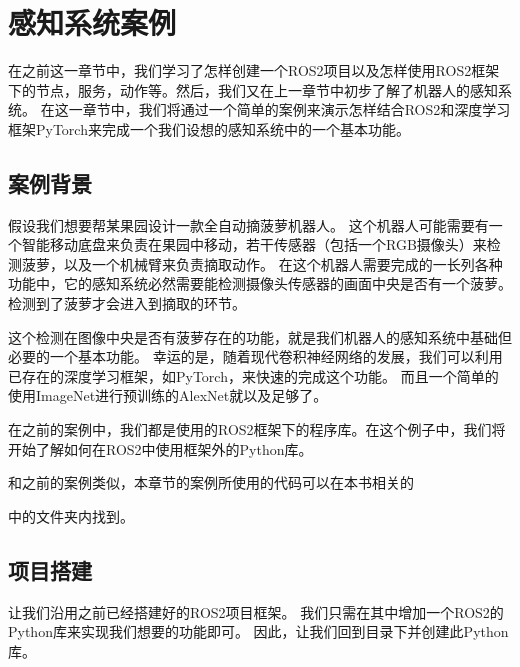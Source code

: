 \documentclass[letterpaper,10pt,english]{sphinxmanual}
\begin{document}
\section{感知系统案例}
\label{\detokenize{chapter_rl_sys/perception_code_ex:id1}}\label{\detokenize{chapter_rl_sys/perception_code_ex::doc}}
\sphinxAtStartPar
在之前这一章节中，我们学习了怎样创建一个ROS2项目以及怎样使用ROS2框架下的节点，服务，动作等。然后，我们又在上一章节中初步了解了机器人的感知系统。
在这一章节中，我们将通过一个简单的案例来演示怎样结合ROS2和深度学习框架PyTorch来完成一个我们设想的感知系统中的一个基本功能。


\subsection{案例背景}
\label{\detokenize{chapter_rl_sys/perception_code_ex:id2}}
\sphinxAtStartPar
假设我们想要帮某果园设计一款全自动摘菠萝机器人。
这个机器人可能需要有一个智能移动底盘来负责在果园中移动，若干传感器（包括一个RGB摄像头）来检测菠萝，以及一个机械臂来负责摘取动作。
在这个机器人需要完成的一长列各种功能中，它的感知系统必然需要能检测摄像头传感器的画面中央是否有一个菠萝。
检测到了菠萝才会进入到摘取的环节。

\sphinxAtStartPar
这个检测在图像中央是否有菠萝存在的功能，就是我们机器人的感知系统中基础但必要的一个基本功能。
幸运的是，随着现代卷积神经网络的发展，我们可以利用已存在的深度学习框架，如PyTorch，来快速的完成这个功能。
而且一个简单的使用ImageNet进行预训练的AlexNet就以及足够了。

\sphinxAtStartPar
在之前的案例中，我们都是使用的ROS2框架下的程序库。在这个例子中，我们将开始了解如何在ROS2中使用框架外的Python库。

\sphinxAtStartPar
和之前的案例类似，本章节的案例所使用的代码可以在本书相关的%
\begin{footnote}[94]\sphinxAtStartFootnote
{}
%
\end{footnote}中的文件夹内找到。


\subsection{项目搭建}
\label{\detokenize{chapter_rl_sys/perception_code_ex:id3}}
\sphinxAtStartPar
让我们沿用之前已经搭建好的ROS2项目框架。
我们只需在其中增加一个ROS2的Python库来实现我们想要的功能即可。
因此，让我们回到目录下并创建此Python库。
\end{document}

